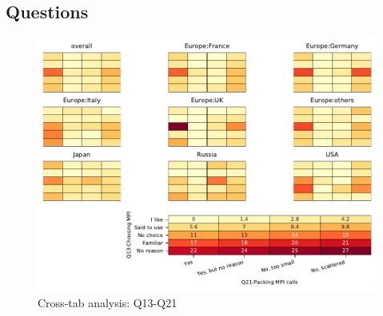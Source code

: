 
\subsection{Questions}


\begin{figure}
\begin{center}
\includegraphics[width=12cm]{../pdfs/Q13-Q21.pdf}
\caption{Cross-tab analysis: Q13-Q21}
\label{fig:Q13-Q21}
\end{center}
\end{figure}
